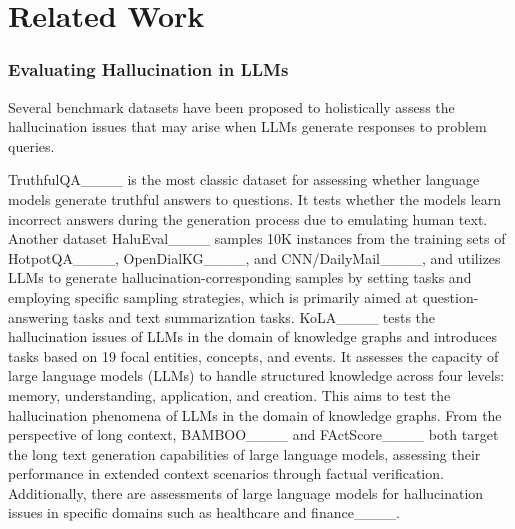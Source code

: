 \section{Related Work}
\subsubsection*{\textbf{Evaluating Hallucination in LLMs}}
Several benchmark datasets have been proposed to holistically assess the hallucination issues that may arise when LLMs generate responses to problem queries. 

TruthfulQA____ is the most classic dataset for assessing whether language models generate truthful answers to questions. 
It tests whether the models learn incorrect answers during the generation process due to emulating human text. 
Another dataset HaluEval____ samples 10K instances from the training sets of HotpotQA____, OpenDialKG____, and CNN/DailyMail____, and utilizes LLMs to generate hallucination-corresponding samples by setting tasks and employing specific sampling strategies, which is primarily aimed at question-answering tasks and text summarization tasks. 
KoLA____ tests the hallucination issues of LLMs in the domain of knowledge graphs and introduces tasks based on 19 focal entities, concepts, and events. 
It assesses the capacity of large language models (LLMs) to handle structured knowledge across four levels: memory, understanding, application, and creation. 
This aims to test the hallucination phenomena of LLMs in the domain of knowledge graphs. 
From the perspective of long context, BAMBOO____ and FActScore____ both target the long text generation capabilities of large language models, assessing their performance in extended context scenarios through factual verification. 
Additionally, there are assessments of large language models for hallucination issues in specific domains such as healthcare and finance____.


